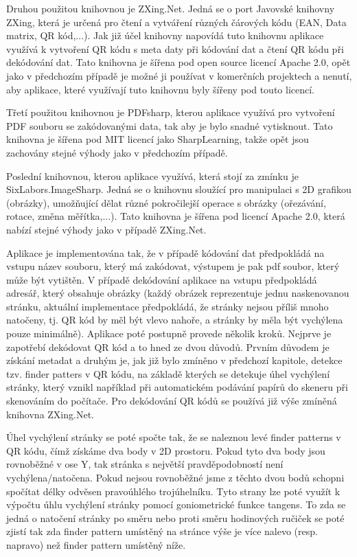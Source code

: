 \documentclass[conference]{IEEEtran}
\begin{document}
Druhou použitou knihovnou je ZXing.Net. Jedná se o port Javovské knihovny ZXing, která je určená pro čtení a vytváření různých čárových kódu (EAN, Data matrix, QR kód,...). Jak již účel knihovny napovídá tuto knihovnu aplikace využívá k vytvoření QR kódu s meta daty při kódování dat a čtení QR kódu při dekódování dat. Tato knihovna je šířena pod open source licencí Apache 2.0, opět jako v předchozím případě je možné ji používat v komerčních projektech a nenutí, aby aplikace, které využívají tuto knihovnu byly šířeny pod touto licencí.


Třetí použitou knihovnou je PDFsharp, kterou aplikace využívá pro vytvoření PDF souboru se zakódovanými data, tak aby je bylo snadné vytisknout. Tato knihovna je šířena pod MIT licencí jako SharpLearning, takže opět jsou zachovány stejné výhody jako v předchozím případě.

Poslední knihovnou, kterou aplikace využívá, která stojí za zmínku je SixLabors.ImageSharp. Jedná se o knihovnu sloužící pro manipulaci s 2D grafikou (obrázky), umožňující dělat různé pokročilejší operace s obrázky (ořezávání, rotace, změna měřítka,...). Tato knihovna je šířena pod licencí Apache 2.0, která nabízí stejné výhody jako v případě ZXing.Net.

Aplikace je implementována tak, že v případě kódování dat předpokládá na vstupu název souboru, který má zakódovat, výstupem je pak pdf soubor, který může být vytištěn. V případě dekódování aplikace na vstupu předpokládá adresář, který obsahuje obrázky (každý obrázek reprezentuje jednu naskenovanou stránku, aktuální implementace předpokládá, že stránky nejsou příliš mnoho natočeny, tj. QR kód by měl být vlevo nahoře, a stránky by měla být vychýlena pouze minimálně). Aplikace poté postupně provede několik kroků. Nejprve je zapotřebí dekódovat QR kód a to hned ze dvou důvodů. Prvním důvodem je získání metadat a druhým je, jak již bylo zmíněno v předchozí kapitole, detekce tzv. finder patters v QR kódu, na základě kterých se detekuje úhel vychýlení stránky, který vznikl například při automatickém podávání papírů do skeneru při skenováním do počítače. Pro dekódování QR kódů se používá již výše zmíněná knihovna ZXing.Net. 

Úhel vychýlení stránky se poté spočte tak, že se naleznou levé finder patterns v QR kódu, čímž získáme dva body v 2D prostoru. Pokud tyto dva body jsou rovnoběžné v ose Y, tak stránka s největší pravděpodobností není vychýlena/natočena. Pokud nejsou rovnoběžné jsme z těchto dvou bodů schopni spočítat délky odvěsen pravoúhlého trojúhelníku. Tyto strany lze poté využít k výpočtu úhlu vychýlení stránky pomocí goniometrické funkce tangens. To zda se jedná o natočení stránky po směru nebo proti směru hodinových ručiček se poté zjistí tak zda finder pattern umístěný na stránce výše je více nalevo (resp. napravo) než finder pattern umístěný níže.
\end{document}
